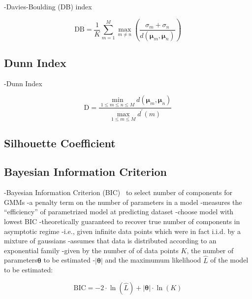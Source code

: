 -Davies-Boulding (DB) index~\cite{davies1979dbindex}

\begin{equation}
\label{eqn:chap10-db-index}
\textrm{DB} = \frac{1}{K} \displaystyle\sum\limits_{m=1}^{M} \max_{m \ne n} \left(\frac{\sigma_{m} + \sigma_{n}}{d\left(\boldsymbol{\mu}_{m},\boldsymbol{\mu}_{n}\right)}\right) 
\end{equation}

\subsection{Dunn Index}
\label{sec:chap10-dunn-index}

-Dunn Index~\cite{dunn1974index}

\begin{equation}
\label{eqn:chap10-dunn-index}
\textrm{D} = \frac{\min_{1 \le m \le n \le M} d(\boldsymbol{\mu}_{m},\boldsymbol{\mu}_{n})}{\max_{1 \le m \le M} d^'(m)}
\end{equation}

\subsection{Silhouette Coefficient}
\label{sec:chap10-silhouette-coeff}

\subsection{Bayesian Information Criterion}
\label{sec:chap10-bic}

-Bayesian Information Criterion (BIC)~\cite{schwarz1978bic} to select number of components for \acp{GMM}
-a penalty term on the number of parameters in a model
  -measures the ``efficiency'' of parametrized model at predicting dataset
  -choose model with lowest BIC
-theoretically guaranteed to recover true number of components in asymptotic regime
  -i.e., given infinite data points which were in fact i.i.d. by a mixture of gaussians
  -assumes that data is distributed according to an exponential family 
-given by the number of of data points $K$, the number of parameters$\boldsymbol{\theta}$ to be estimated
-$|\boldsymbol{\theta}|$ and the maximumum likelihood $\hat{L}$ of the model to be estimated:
    
\begin{equation}
\label{eqn:chap10-bic}
\textrm{BIC} = -2 \cdot \ln(\hat{L}) + |\boldsymbol{\theta}| \cdot \ln(K) 
\end{equation}

